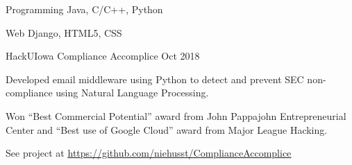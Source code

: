 \documentclass[12pt, a4paper]{awesome-cv}
\begin{document}
\begin{cventries}

\end{cventries}


\begin{cvskills}
  \cvskill
    {Programming} 
    {Java, C/C++, Python} 

  \cvskill
    {Web} 
    {Django, HTML5, CSS} 

\end{cvskills}


\begin{cventries}

    \cventry
	{HackUIowa}
 	{Compliance Accomplice}
	{Oct 2018}
	{}
	{
	  \begin{cvitems}
	     \item{Developed email middleware using Python to detect and prevent SEC non-compliance using Natural Language Processing.}
	     \item{Won “Best Commercial Potential” award from John Pappajohn Entrepreneurial Center and “Best use of Google Cloud” award from Major League Hacking.}
	     \item{See project at \underline{\href{https://github.com/niehusst/ComplianceAccomplice}{https://github.com/niehusst/ComplianceAccomplice}}} 
	  \end{cvitems}
	}
\end{cventries}
\end{document}
